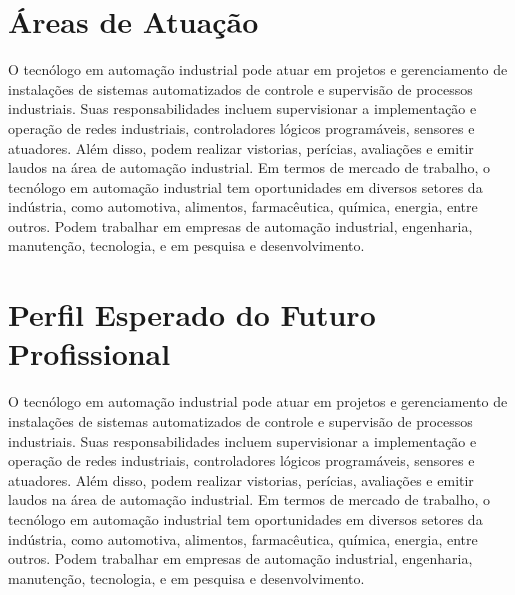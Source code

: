 \chapter{Áreas de Atuação}


O tecnólogo em automação industrial pode atuar em projetos e gerenciamento de instalações de sistemas automatizados de controle e supervisão de processos industriais. Suas responsabilidades incluem supervisionar a implementação e operação de redes industriais, controladores lógicos programáveis, sensores e atuadores. Além disso, podem realizar vistorias, perícias, avaliações e emitir laudos na área de automação industrial. Em termos de mercado de trabalho, o tecnólogo em automação industrial tem oportunidades em diversos setores da indústria, como automotiva, alimentos, farmacêutica, química, energia, entre outros. Podem trabalhar em empresas de automação industrial, engenharia, manutenção, tecnologia, e em pesquisa e desenvolvimento.\\

\chapter{Perfil Esperado do Futuro Profissional}


O tecnólogo em automação industrial pode atuar em projetos e gerenciamento de instalações de sistemas automatizados de controle e supervisão de processos industriais. Suas responsabilidades incluem supervisionar a implementação e operação de redes industriais, controladores lógicos programáveis, sensores e atuadores. Além disso, podem realizar vistorias, perícias, avaliações e emitir laudos na área de automação industrial. Em termos de mercado de trabalho, o tecnólogo em automação industrial tem oportunidades em diversos setores da indústria, como automotiva, alimentos, farmacêutica, química, energia, entre outros. Podem trabalhar em empresas de automação industrial, engenharia, manutenção, tecnologia, e em pesquisa e desenvolvimento.


